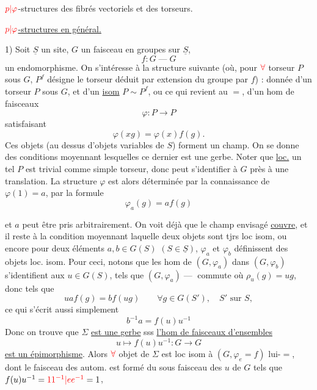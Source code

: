 
${\color{red}p|\varphi}$-structures des
fibrés vectoriels et
des torseurs.


\uline{${\color{red}p|\varphi}$-structures en général.}

1) Soit $\underline S$ un site, $G$ un faisceau en groupes sur $\underline S$,
\[
f:G\mathbin{\text{---}}G
\]
un endomorphisme. On s'intéresse à la structure
suivante (où, pour ${\color{red}\forall}$ torseur $P$ sous $G$,
$P^f$ désigne le torseur déduit par extension du
groupe par $f$) : donnée d'un torseur $P$
sous $G$, et d'un \uline{isom} $P\sim P^f$, ou ce qui
revient au $=$, d'un hom de faisceaux
\[
\varphi:P\longrightarrow P
\]
satisfaisant
\[
\varphi(xg)=\varphi(x)f(g).
\]
Ces objets (au dessus d'objets variables de $S$)
forment un champ.
On se donne des conditions
moyennant lesquelles ce dernier est une gerbe.
Noter que \uline{loc.} un tel $P$ est trivial comme
simple torseur, donc peut s'identifier à $G$ près
à une translation. La structure $\varphi$ est alors
déterminée par la connaissance de $\varphi(1)=a$,
par la formule
\[
\varphi_a(g)=a f(g)
\]

et $a$ peut être pris arbitrairement. On voit déjà
que le champ envisagé \uline{couvre}, et il reste
à  la condition moyennant laquelle deux
objets sont tjrs loc isom, ou encore
pour deux éléments $a,b\in G(S)$ $(S\in\underline S)$,
$\varphi_a$ et $\varphi_b$ définissent des objets loc. isom.
Pour ceci, notons que les hom de
$(G,\varphi_a)$ dans $(G,\varphi_b)$ s'identifient aux $u\in G(S)$,
tels que
$(G,\varphi_a)\mathbin{\text{---}}$
commute
où $\rho_u(g)=ug$, donc tels que
\[
u a f(g)=b f(ug)\qquad \forall g\in G(S'),\quad S'\text{ sur }S,
\]
ce qui s'écrit aussi simplement
\[
b^{-1}a=f(u)u^{-1}
\]
Donc on trouve que $\Sigma$ \uline{est une gerbe} sss
\uline{l'hom de faisceaux d'ensembles}
\[
u\longmapsto f(u)u^{-1}:G\longrightarrow G
\]
\uline{est un épimorphisme}. Alors ${\color{red}\forall}$ objet de
$\Sigma$ est loc isom à $(G,\varphi_e=f)$ lui-$=$,
dont le faisceau des autom. est formé du
sous faisceau des $u$ de $G$ tels que $f(u)u^{-1}={\color{red}11^{-1}|ee^{-1}}=1$,

